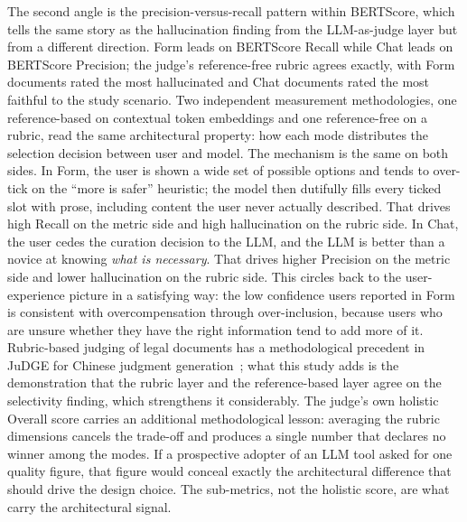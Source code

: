 The second angle is the precision-versus-recall pattern within
BERTScore, which tells the same story as the hallucination
finding from the LLM-as-judge layer but from a different
direction. Form leads on BERTScore Recall while Chat leads on
BERTScore Precision; the judge's reference-free rubric agrees
exactly, with Form documents rated the most hallucinated and
Chat documents rated the most faithful to the study scenario.
Two independent measurement methodologies, one reference-based
on contextual token embeddings and one reference-free on a
rubric, read the same architectural property: how each mode
distributes the selection decision between user and model. The
mechanism is the same on both sides. In Form, the user is shown
a wide set of possible options and tends to over-tick on the
``more is safer'' heuristic; the model then dutifully fills
every ticked slot with prose, including content the user never
actually described. That drives high Recall on the metric side
and high hallucination on the rubric side. In Chat, the user
cedes the curation decision to the LLM, and the LLM is better
than a novice at knowing \emph{what is necessary}. That drives
higher Precision on the metric side and lower hallucination on
the rubric side. This circles back to the user-experience
picture in a satisfying way: the low confidence users reported
in Form is consistent with overcompensation through
over-inclusion, because users who are unsure whether they have
the right information tend to add more of it. Rubric-based
judging of legal documents has a methodological precedent in
JuDGE for Chinese judgment
generation~\cite{suJuDGEBenchmarkingJudgment2025}; what this
study adds is the demonstration that the rubric layer and the
reference-based layer agree on the selectivity finding, which
strengthens it considerably. The judge's own holistic Overall
score carries an additional methodological lesson: averaging
the rubric dimensions cancels the trade-off and produces a
single number that declares no winner among the modes. If a
prospective adopter of an LLM tool asked for one quality figure,
that figure would conceal exactly the architectural difference
that should drive the design choice. The sub-metrics, not the
holistic score, are what carry the architectural signal.

